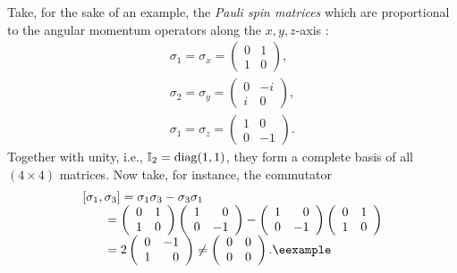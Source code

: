 {Take, for the sake of an example, the
{\em Pauli spin matrices}
which are proportional to the angular momentum operators along the $x,y,z$-axis
\cite{schiff-55}:
\begin{equation}
\begin{array}{l}
\sigma_1=\sigma_x=
\left(
\begin{array}{rrrr}
0&1\\
1&0
\end{array}
\right),   \\
\sigma_2=\sigma_y=
\left(
\begin{array}{rrrrrr}
0&-i\\
i&0
\end{array}
\right),   \\
\sigma_1=\sigma_z=
\left(
\begin{array}{rrrrrrr}
1&0\\
0&-1
\end{array}
\right).
\end{array}
\end{equation}
Together with unity, i.e., ${\Bbb I}_2=\textrm{diag}(1,1)$,
they form a complete basis of all $(4\times 4)$ matrices.
Now take, for instance, the commutator
\begin{equation}
\begin{array}{l}
[\sigma_1,\sigma_3]= \sigma_1\sigma_3-\sigma_3\sigma_1\\
\qquad
=
\left(
\begin{array}{rrrrrrrr}
0&1\\
1&0
\end{array}
\right)
\left(
\begin{array}{rrrrrrrrrr}
1&0\\
0&-1
\end{array}
\right)
-
\left(
\begin{array}{rrrrrrrrrrrr}
1&0\\
0&-1
\end{array}
\right)
\left(
\begin{array}{rrrrrrrrrrrrrrrr}
0&1\\
1&0
\end{array}
\right)\\
\qquad
=  2
\left(
\begin{array}{rrrrrrrrrrrrr}
0&-1\\
1&0
\end{array}
\right)\neq
\left(
\begin{array}{cccccccccc}
0&0\\
0&0
\end{array}
\right)
.    \textrm{\eexample}
\end{array}
\end{equation}
}

